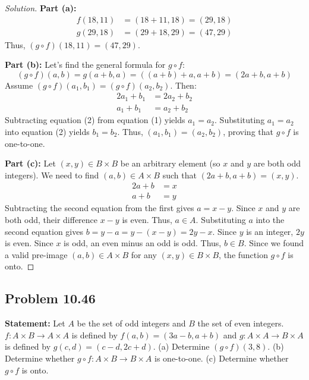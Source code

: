 \documentclass[11pt, a4paper]{article}
\theoremstyle{definition}
\theoremstyle{remark}
\begin{document}
\begin{proof}[Solution]
\textbf{Part (a):}
\begin{align*}
    f(18, 11) &= (18 + 11, 18) = (29, 18) \\
    g(29, 18) &= (29 + 18, 29) = (47, 29)
\end{align*}
Thus, $(g \circ f)(18, 11) = (47, 29)$.

\textbf{Part (b):} Let's find the general formula for $g \circ f$:
\[ (g \circ f)(a, b) = g(a+b, a) = ((a+b)+a, a+b) = (2a+b, a+b) \]
Assume $(g \circ f)(a_1, b_1) = (g \circ f)(a_2, b_2)$. Then:
\begin{align}
    2a_1 + b_1 &= 2a_2 + b_2 \\
    a_1 + b_1 &= a_2 + b_2
\end{align}
Subtracting equation (2) from equation (1) yields $a_1 = a_2$. Substituting $a_1 = a_2$ into equation (2) yields $b_1 = b_2$. Thus, $(a_1, b_1) = (a_2, b_2)$, proving that $g \circ f$ is one-to-one.

\textbf{Part (c):} Let $(x, y) \in B \times B$ be an arbitrary element (so $x$ and $y$ are both odd integers). We need to find $(a, b) \in A \times B$ such that $(2a+b, a+b) = (x, y)$.
\begin{align*}
    2a + b &= x \\
    a + b &= y
\end{align*}
Subtracting the second equation from the first gives $a = x - y$. Since $x$ and $y$ are both odd, their difference $x - y$ is even. Thus, $a \in A$.
Substituting $a$ into the second equation gives $b = y - a = y - (x - y) = 2y - x$. Since $y$ is an integer, $2y$ is even. Since $x$ is odd, an even minus an odd is odd. Thus, $b \in B$.
Since we found a valid pre-image $(a, b) \in A \times B$ for any $(x, y) \in B \times B$, the function $g \circ f$ is onto.
\end{proof}

\subsection*{Problem 10.46}
\textbf{Statement:} Let $A$ be the set of odd integers and $B$ the set of even integers. $f: A \times B \to A \times A$ is defined by $f(a, b) = (3a - b, a + b)$ and $g: A \times A \to B \times A$ is defined by $g(c, d) = (c - d, 2c + d)$.
(a) Determine $(g \circ f)(3, 8)$.
(b) Determine whether $g \circ f: A \times B \to B \times A$ is one-to-one.
(c) Determine whether $g \circ f$ is onto.
\end{document}
